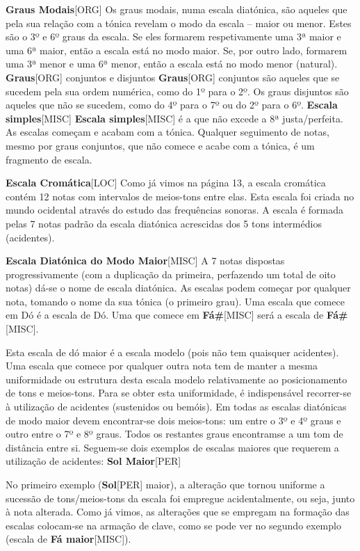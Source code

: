 \documentclass[a4paper,12pt]{article}
\begin{document}
\textbf{Graus Modais}\textsc{[ORG]} Os graus modais, numa escala diatónica, são aqueles que pela sua relação com a tónica revelam o modo da escala -- maior ou menor. Estes são o 3º e 6º graus da escala. Se eles formarem respetivamente uma 3ª maior e uma 6ª maior, então a escala está no modo maior. Se, por outro lado, formarem uma 3ª menor e uma 6ª menor, então a escala está no modo menor (natural). \textbf{Graus}\textsc{[ORG]} conjuntos e disjuntos \textbf{Graus}\textsc{[ORG]} conjuntos são aqueles que se sucedem pela sua ordem numérica, como do 1º para o 2º. Os graus disjuntos são aqueles que não se sucedem, como do 4º para o 7º ou do 2º para o 6º. \textbf{Escala simples}\textsc{[MISC]} \textbf{Escala simples}\textsc{[MISC]} é a que não excede a 8ª justa/perfeita. As escalas começam e acabam com a tónica. Qualquer seguimento de notas, mesmo por graus conjuntos, que não comece e acabe com a tónica, é um fragmento de escala.

\textbf{Escala Cromática}\textsc{[LOC]} Como já vimos na página 13, a escala cromática contém 12 notas com intervalos de meios-tons entre elas. Esta escala foi criada no mundo ocidental através do estudo das frequências sonoras. A escala é formada pelas 7 notas padrão da escala diatónica acrescidas dos 5 tons intermédios (acidentes).

\textbf{Escala Diatónica do Modo Maior}\textsc{[MISC]} A 7 notas dispostas progressivamente (com a duplicação da primeira, perfazendo um total de oito notas) dá-se o nome de escala diatónica. As escalas podem começar por qualquer nota, tomando o nome da sua tónica (o primeiro grau). Uma escala que comece em Dó é a escala de Dó. Uma que comece em \textbf{Fá\#}\textsc{[MISC]} será a escala de \textbf{Fá\#}\textsc{[MISC]}.

Esta escala de dó maior é a escala modelo (pois não tem quaisquer acidentes). Uma escala que comece por qualquer outra nota tem de manter a mesma uniformidade ou estrutura desta escala modelo relativamente ao posicionamento de tons e meios-tons. Para se obter esta uniformidade, é indispensável recorrer-se à utilização de acidentes (sustenidos ou bemóis). Em todas as escalas diatónicas de modo maior devem encontrar-se dois meios-tons: um entre o 3º e 4º graus e outro entre o 7º e 8º graus. Todos os restantes graus encontramse a um tom de distância entre si. Seguem-se dois exemplos de escalas maiores que requerem a utilização de acidentes: \textbf{Sol Maior}\textsc{[PER]}

No primeiro exemplo (\textbf{Sol}\textsc{[PER]} maior), a alteração que tornou uniforme a sucessão de tons/meios-tons da escala foi empregue acidentalmente, ou seja, junto à nota alterada. Como já vimos, as alterações que se empregam na formação das escalas colocam-se na armação de clave, como se pode ver no segundo exemplo (escala de \textbf{Fá maior}\textsc{[MISC]}).
\end{document}
